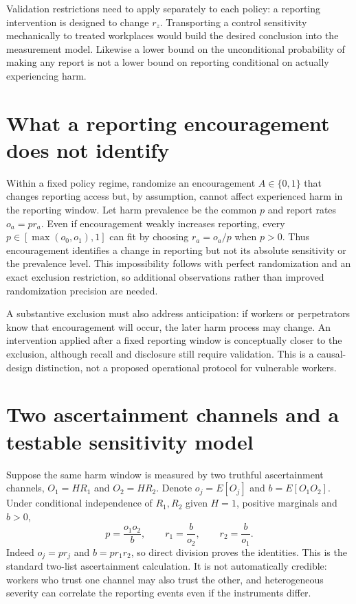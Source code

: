 \documentclass[11pt,a4paper]{article}
\begin{document}
Validation restrictions need to apply separately to each policy: a reporting intervention is designed to change $r_z$. Transporting a control sensitivity mechanically to treated workplaces would build the desired conclusion into the measurement model. Likewise a lower bound on the unconditional probability of making any report is not a lower bound on reporting conditional on actually experiencing harm.

\section{What a reporting encouragement does not identify}
Within a fixed policy regime, randomize an encouragement $A\in\{0,1\}$ that changes reporting access but, by assumption, cannot affect experienced harm in the reporting window. Let harm prevalence be the common $p$ and report rates $o_a=pr_a$. Even if encouragement weakly increases reporting, every $p\in[\max(o_0,o_1),1]$ can fit by choosing $r_a=o_a/p$ when $p>0$. Thus encouragement identifies a change in reporting but not its absolute sensitivity or the prevalence level. This impossibility follows with perfect randomization and an exact exclusion restriction, so additional observations rather than improved randomization precision are needed.

A substantive exclusion must also address anticipation: if workers or perpetrators know that encouragement will occur, the later harm process may change. An intervention applied after a fixed reporting window is conceptually closer to the exclusion, although recall and disclosure still require validation. This is a causal-design distinction, not a proposed operational protocol for vulnerable workers.

\section{Two ascertainment channels and a testable sensitivity model}
Suppose the same harm window is measured by two truthful ascertainment channels, $O_1=HR_1$ and $O_2=HR_2$. Denote $o_j=E[O_j]$ and $b=E[O_1O_2]$. Under conditional independence of $R_1,R_2$ given $H=1$, positive marginals and $b>0$,
\[
 p=\frac{o_1o_2}{b},\qquad r_1=\frac b{o_2},\qquad r_2=\frac b{o_1}.
\tag{2}
\]
Indeed $o_j=pr_j$ and $b=pr_1r_2$, so direct division proves the identities. This is the standard two-list ascertainment calculation. It is not automatically credible: workers who trust one channel may also trust the other, and heterogeneous severity can correlate the reporting events even if the instruments differ.
\end{document}

